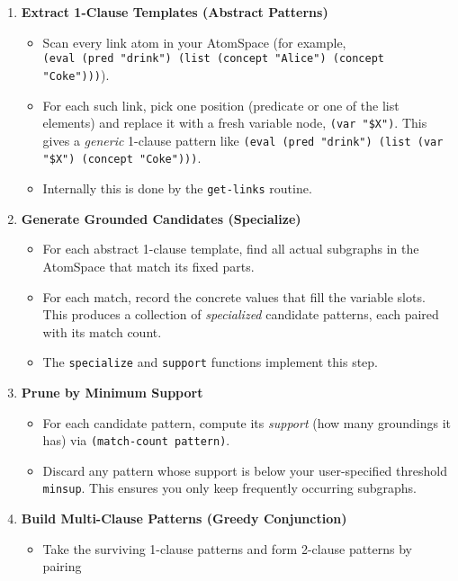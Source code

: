 \documentclass{article}
\begin{document}
\begin{enumerate}
  \item \textbf{Extract 1-Clause Templates (Abstract Patterns)}
     \begin{itemize}
        \item Scan every link atom in your AtomSpace (for example, \\
          \verb|(eval (pred "drink") (list (concept "Alice") (concept "Coke")))|).
          \item  For each such link, pick one position (predicate or one of the list elements)
             and replace it with a fresh variable node, \verb|(var "$X")|.  This gives
             a \emph{generic} 1-clause pattern like
               \verb|(eval (pred "drink") (list (var "$X") (concept "Coke")))|.  
         \item Internally this is done by the \texttt{get-links} routine.
      \end{itemize}
  \item \textbf{Generate Grounded Candidates (Specialize)}
    \begin{itemize}
    \item For each abstract 1-clause template, find all actual subgraphs in the AtomSpace
    that match its fixed parts.  
    \item For each match, record the concrete values that
    fill the variable slots.  This produces a collection of \emph{specialized}
    candidate patterns, each paired with its match count.  
    \item The \texttt{specialize}
    and \texttt{support} functions implement this step.
      \end{itemize}
  \item \textbf{Prune by Minimum Support}
    \begin{itemize}
    \item For each candidate pattern, compute its \emph{support} (how many groundings it has)
    via \verb|(match-count pattern)|.  
    \item Discard any pattern whose support is below
    your user-specified threshold \verb|minsup|.  This ensures you only keep
    frequently occurring subgraphs.
      \end{itemize}
  \item \textbf{Build Multi-Clause Patterns (Greedy Conjunction)}
    \begin{itemize}
    \item Take the surviving 1-clause patterns and form 2-clause patterns by pairing

\end{itemize}
\end{enumerate}
\end{document}
